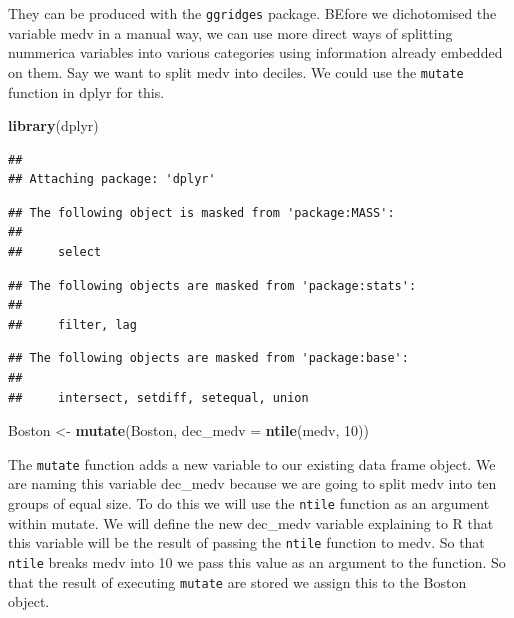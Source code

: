 \documentclass[]{book}
\newenvironment{Shaded}{\begin{snugshade}}{\end{snugshade}}
\newcommand{\DataTypeTok}[1]{\textcolor[rgb]{0.13,0.29,0.53}{#1}}
\newcommand{\DecValTok}[1]{\textcolor[rgb]{0.00,0.00,0.81}{#1}}
\newcommand{\KeywordTok}[1]{\textcolor[rgb]{0.13,0.29,0.53}{\textbf{#1}}}
\newcommand{\NormalTok}[1]{#1}
\newcommand{\StringTok}[1]{\textcolor[rgb]{0.31,0.60,0.02}{#1}}
\theoremstyle{definition}
\theoremstyle{definition}
\theoremstyle{definition}
\theoremstyle{remark}
\begin{document}
They can be produced with the \texttt{ggridges} package. BEfore we
dichotomised the variable medv in a manual way, we can use more direct
ways of splitting nummerica variables into various categories using
information already embedded on them. Say we want to split medv into
deciles. We could use the \texttt{mutate} function in dplyr for this.

\begin{Shaded}
\begin{Highlighting}[]
\KeywordTok{library}\NormalTok{(dplyr)}
\end{Highlighting}
\end{Shaded}

\begin{verbatim}
## 
## Attaching package: 'dplyr'
\end{verbatim}

\begin{verbatim}
## The following object is masked from 'package:MASS':
## 
##     select
\end{verbatim}

\begin{verbatim}
## The following objects are masked from 'package:stats':
## 
##     filter, lag
\end{verbatim}

\begin{verbatim}
## The following objects are masked from 'package:base':
## 
##     intersect, setdiff, setequal, union
\end{verbatim}

\begin{Shaded}
\begin{Highlighting}[]
\NormalTok{Boston <-}\StringTok{ }\KeywordTok{mutate}\NormalTok{(Boston, }\DataTypeTok{dec_medv =} \KeywordTok{ntile}\NormalTok{(medv, }\DecValTok{10}\NormalTok{))}
\end{Highlighting}
\end{Shaded}

The \texttt{mutate} function adds a new variable to our existing data
frame object. We are naming this variable dec\_medv because we are going
to split medv into ten groups of equal size. To do this we will use the
\texttt{ntile} function as an argument within mutate. We will define the
new dec\_medv variable explaining to R that this variable will be the
result of passing the \texttt{ntile} function to medv. So that
\texttt{ntile} breaks medv into 10 we pass this value as an argument to
the function. So that the result of executing \texttt{mutate} are stored
we assign this to the Boston object.
\end{document}
